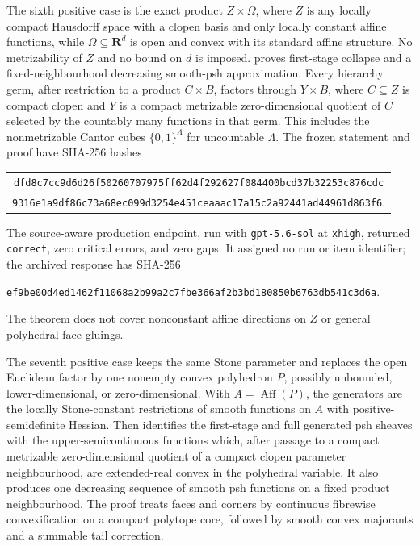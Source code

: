 The sixth positive case is the exact product $Z\times\Omega$, where $Z$
is any locally compact Hausdorff space with a clopen basis and only locally
constant affine functions, while
$\Omega\subseteq\mathbf R^d$ is open and convex with its standard affine
structure.  No metrizability of $Z$ and no bound on $d$ is imposed.
 proves first-stage collapse and a
fixed-neighbourhood decreasing smooth-psh approximation.  Every hierarchy
germ, after restriction to a product $C\times B$, factors through
$Y\times B$, where $C\subseteq Z$ is compact clopen and $Y$ is a compact
metrizable zero-dimensional quotient of $C$ selected by the countably many
functions in that germ.  This includes the nonmetrizable Cantor cubes
$\{0,1\}^{\Lambda}$ for uncountable $\Lambda$.  The frozen statement and
proof have SHA-256 hashes
\begin{center}
\small
\begin{tabular}{@{}c@{}}
\nolinkurl{dfd8c7cc9d6d26f50260707975ff62d4f292627f084400bcd37b32253c876cdc}\\
\nolinkurl{9316e1a9df86c73a68ec099d3254e451ceaaac17a15c2a92441ad44961d863f6}.
\end{tabular}
\end{center}
The source-aware production endpoint, run with \texttt{gpt-5.6-sol} at
\texttt{xhigh}, returned \texttt{correct}, zero critical errors, and zero
gaps.  It assigned no run or item identifier; the archived response has
SHA-256
\begin{center}
\small
\nolinkurl{ef9be00d4ed1462f11068a2b99a2c7fbe366af2b3bd180850b6763db541c3d6a}.
\end{center}
The theorem does not cover nonconstant affine directions on $Z$ or general
polyhedral face gluings.

The seventh positive case keeps the same Stone parameter and replaces the
open Euclidean factor by one nonempty convex polyhedron \(P\), possibly
unbounded, lower-dimensional, or zero-dimensional.  With
\(A=\operatorname{Aff}(P)\), the generators are the locally
Stone-constant restrictions of smooth functions on \(A\) with
positive-semidefinite Hessian.  Then
 identifies the first-stage and
full generated psh sheaves with the upper-semicontinuous functions which,
after passage to a compact metrizable zero-dimensional quotient of a compact
clopen parameter neighbourhood, are extended-real convex in the
polyhedral variable.  It also produces one decreasing sequence of smooth
psh functions on a fixed product neighbourhood.  The proof treats faces and
corners by continuous fibrewise convexification on a compact polytope core,
followed by smooth convex majorants and a summable tail correction.

